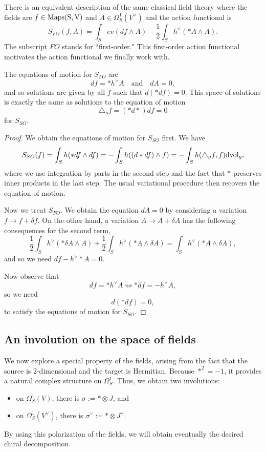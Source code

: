 There is an equivalent description of the same classical field theory where the fields are $f \in \rm{Maps}(S,V)$ and $A \in \Omega^1_S(V^\vee) $ and the action functional is
\[
S_{FO}(f,A) = \int_S ev(df \wedge A) - \frac{1}{2} \int_S h^\vee(\ast A \wedge A).
\]
The subscript $FO$ stands for ``first-order." This first-order action functional motivates the action functional we finally work with.

\begin{lemma}
The equations of motion for $S_{FO}$ are
\[
df = \ast h^\vee A  \quad\text{and}\quad dA = 0,
\]
and so solutions are given by all $f$ such that $d(\ast df) = 0$. This space of solutions is exactly the same as solutions to the equation of motion 
\[
\triangle_g f = (\ast d \ast) df = 0
\]
for $S_{SO}$.
\end{lemma}

\begin{proof}
We obtain the equations of motion for $S_{SO}$ first. We have
\[
S_{SO}(f)  = \int_S h(\ast df \wedge df) = - \int_S h((d \ast d f) \wedge f) = - \int_S h(\triangle_g f, f) {\rm dvol}_g,
\]
where we use integration by parts in the second step and the fact that $\ast$ preserves inner products in the last step. The usual variational procedure then recovers the equation of motion.

Now we treat $S_{FO}$. We obtain the equation $dA = 0$ by considering a variation $f \to f + \delta f$. On the other hand, a variation $A \to A + \delta A$ has the following consequences for the second term,
\[
\frac{1}{2} \int_S h^\vee(\ast \delta A \wedge A) + \frac{1}{2} \int_S h^\vee(\ast A \wedge \delta A) = \int_S h^\vee(\ast A \wedge \delta A),
\]
and so we need $df - h^\vee \ast A= 0$.

Now observe that
\[
df = \ast h^\vee A  \Leftrightarrow \ast df = - h^\vee A,
\]
so we need
\[
d (\ast df) = 0,
\]
to satisfy the equations of motion for $S_{SO}$.
\end{proof}

\subsection{An involution on the space of fields}

We now explore a special property of the fields, arising from the fact that the source is 2-dimensional and the target is Hermitian. Because $\ast^2 = -1$, it provides a natural complex structure on $\Omega^1_S$. Thus, we obtain two involutions:
\begin{itemize}
\item on $\Omega^1_S(V)$, there is $\sigma := \ast \otimes J$, and
\item on $\Omega^1_S(V^\vee)$, there is $\sigma^\vee := \ast \otimes J^\vee$.
\end{itemize}
By using this polarization of the fields, we will obtain eventually the desired chiral decomposition.

